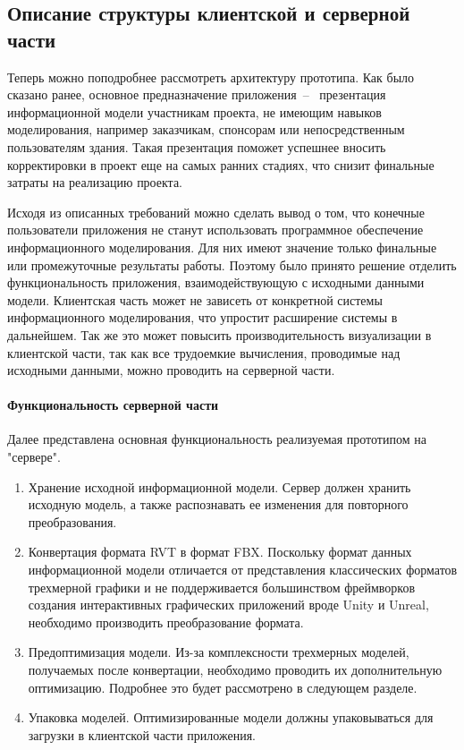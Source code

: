 ﻿\subsection{Описание структуры клиентской и серверной части}

Теперь можно поподробнее рассмотреть архитектуру прототипа.
Как было сказано ранее, основное предназначение приложения~--~
презентация информационной модели участникам проекта,
не имеющим навыков моделирования,
например заказчикам, спонсорам или непосредственным пользователям здания.
Такая презентация поможет успешнее вносить
корректировки в проект еще на самых ранних стадиях,
что снизит финальные затраты на реализацию проекта.%
\cite{Davidson2019}

Исходя из описанных требований можно сделать вывод о том,
что конечные пользователи приложения не станут использовать
программное обеспечение информационного моделирования.
Для них имеют значение только финальные или промежуточные результаты работы.
Поэтому было принято решение отделить функциональность приложения,
взаимодействующую с исходными данными модели.
Клиентская часть может не зависеть
от конкретной системы информационного моделирования,
что упростит расширение системы в дальнейшем.
Так же это может повысить производительность визуализации в клиентской части,
так как все трудоемкие вычисления, проводимые над исходными данными,
можно проводить на серверной части.

\paragraph{Функциональность серверной части}

Далее представлена основная функциональность реализуемая прототипом на "сервере".

\begin{enumerate}
    \item {
        Хранение исходной информационной модели.
        Сервер должен хранить исходную модель,
        а также распознавать ее изменения для повторного преобразования.
    }
    \item {
        Конвертация формата RVT в формат FBX.
        Поскольку формат данных информационной модели отличается от
        представления классических форматов трехмерной графики
        и не поддерживается большинством фреймворков
        создания интерактивных графических приложений
        вроде Unity и Unreal, необходимо производить
        преобразование формата.
    } 
    \item {
        Предоптимизация модели.
        Из-за комплексности трехмерных моделей,
        получаемых после конвертации,
        необходимо проводить их дополнительную оптимизацию.
        Подробнее это будет рассмотрено в следующем разделе.
    }
    \item {
        Упаковка моделей.
        Оптимизированные модели должны упаковываться для
        загрузки в клиентской части приложения.
    }
\end{enumerate}


